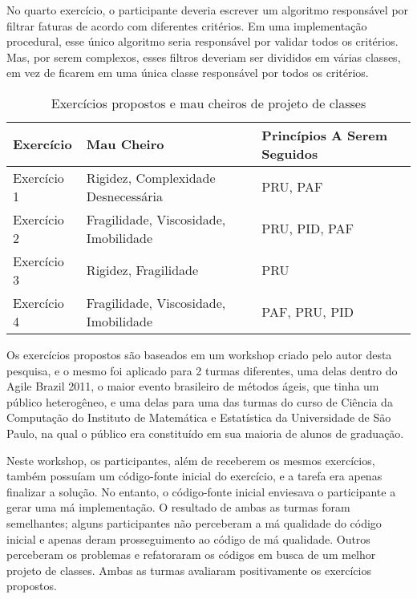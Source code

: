 No quarto exercício, o participante deveria escrever um algoritmo responsável por filtrar faturas de
acordo com diferentes critérios. Em uma implementação procedural, esse único algoritmo seria
responsável por validar todos os critérios. Mas, por serem complexos, esses filtros deveriam ser divididos em 
várias classes, em vez de ficarem em uma única classe responsável por todos os critérios.


\begin{table}
	\centering
	\begin{tabular}{| l | l | l | }
		\hline
		Exercício & Mau Cheiro & Princípios A Serem Seguidos\\
		
		\hline
		
		Exercício 1 & Rigidez, Complexidade Desnecessária & PRU, PAF \\
		Exercício 2 & Fragilidade, Viscosidade, Imobilidade & PRU, PID, PAF \\
		Exercício 3 & Rigidez, Fragilidade & PRU\\
		Exercício 4 & Fragilidade, Viscosidade, Imobilidade & PAF, PRU, PID \\
		
		\hline
	\end{tabular}
	\caption{Exercícios propostos e mau cheiros de projeto de classes}
	\label{tab:problemas-exercicios}
\end{table}

Os exercícios propostos são baseados em um workshop criado pelo autor desta pesquisa, e o mesmo
foi aplicado para 2 turmas diferentes, uma delas dentro do Agile Brazil 2011, o
maior evento brasileiro de métodos ágeis, que tinha um público heterogêneo, e uma delas para
uma das turmas do curso de Ciência da Computação do Instituto de Matemática e Estatística da Universidade
de São Paulo, na qual o público era constituído em sua maioria de alunos de graduação. 

Neste workshop, os participantes, além de receberem os mesmos
exercícios, também possuíam um código-fonte inicial do exercício, e a tarefa era
apenas finalizar a solução. No entanto, o código-fonte inicial enviesava o participante a gerar
uma má implementação. O resultado de ambas as turmas foram semelhantes; alguns participantes
não perceberam a má qualidade do código inicial e apenas deram prosseguimento ao código
de má qualidade. Outros perceberam os problemas e refatoraram os códigos em busca
de um melhor projeto de classes. Ambas as turmas avaliaram positivamente os
exercícios propostos.


